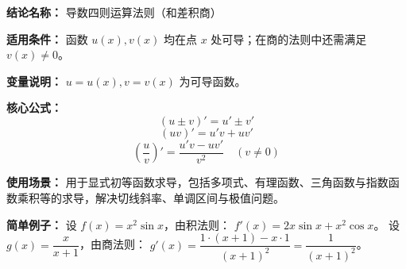 \textbf{结论名称：} 导数四则运算法则（和差积商）

\textbf{适用条件：} 函数 $u(x), v(x)$ 均在点 $x$ 处可导；在商的法则中还需满足 $v(x)\neq 0$。

\textbf{变量说明：} $u=u(x), v=v(x)$ 为可导函数。

\textbf{核心公式：}
\[
\boxed{(u\pm v)' = u' \pm v'}
\]
\[
\boxed{(u v)' = u' v + u v'}
\]
\[
\boxed{\left(\frac{u}{v}\right)' = \frac{u' v - u v'}{v^2} \quad (v\neq 0)}
\]

\textbf{使用场景：} 用于显式初等函数求导，包括多项式、有理函数、三角函数与指数函数乘积等的求导，解决切线斜率、单调区间与极值问题。

\textbf{简单例子：} 
设 $f(x)=x^2\sin x$，由积法则：
$f'(x)=2x\sin x + x^2\cos x$。
设 $g(x)=\dfrac{x}{x+1}$，由商法则：
$g'(x)=\dfrac{1\cdot(x+1)-x\cdot 1}{(x+1)^2}=\dfrac{1}{(x+1)^2}$。